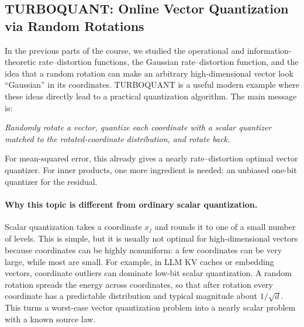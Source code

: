 
\providecommand{\coloneqq}{\mathrel{\mathop:}=}

\subsection{TURBOQUANT: Online Vector Quantization via Random Rotations}
\label{subsec:turboquant}

In the previous parts of the course, we studied the operational and information-theoretic rate--distortion functions, the Gaussian rate--distortion function, and the idea that a random rotation can make an arbitrary high-dimensional vector look ``Gaussian'' in its coordinates.
TURBOQUANT is a useful modern example where these ideas directly lead to a practical quantization algorithm.
The main message is:
\begin{center}
\emph{Randomly rotate a vector, quantize each coordinate with a scalar quantizer matched to the rotated-coordinate distribution, and rotate back.}
\end{center}
For mean-squared error, this already gives a nearly rate--distortion optimal vector quantizer.
For inner products, one more ingredient is needed: an unbiased one-bit quantizer for the residual.

\paragraph{Why this topic is different from ordinary scalar quantization.}
Scalar quantization takes a coordinate $x_j$ and rounds it to one of a small number of levels.
This is simple, but it is usually not optimal for high-dimensional vectors because coordinates can be highly nonuniform: a few coordinates can be very large, while most are small.
For example, in LLM KV caches or embedding vectors, coordinate outliers can dominate low-bit scalar quantization.
A random rotation spreads the energy across coordinates, so that after rotation every coordinate has a predictable distribution and typical magnitude about $1/\sqrt d$.
This turns a worst-case vector quantization problem into a nearly scalar problem with a known source law.

